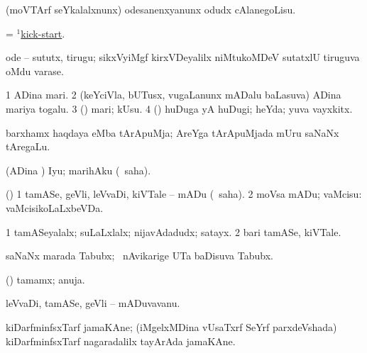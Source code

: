 \bentry
{}
\gl{\sakirx}
\bmng
(moVTArf seYkalalxnunx) odesanenxyanunx odudx cAlanegoLisu. 
\emng
\eentry

\bentry
{}
\gl{\nA}
\bmng
 = \hyperlink{kick-start(1)}{$^1$kick-start}. 
\emng
\eentry

\bentry
{}
\gl{\nA}
\bmng
ode -- sututx, tirugu; sikxVyiMgf kirxVDeyalilx niMtukoMDeV sutatxlU tiruguva oMdu varase. 
\emng
\eentry

\bentry
{}
\gl{\nA}
\bmng
\bnum
\num{1} ADina mari. 
\hypertarget{kid(1)2}{} 
\num{2} (keYciVla, bUTusx, \mo vugaLanunx mADalu baLasuva) ADina mariya togalu. 
\hypertarget{kid(1)3}{} 
\num{3} (\ashi) mari; kUsu. 
\num{4} (\ame) huDuga yA huDugi; heYda; yuva vayxkitx. 
\enum
\emng

\noindent
\gl{\pagu}
\bmng
  barxhamx haqdaya eMba tArApuMja; AreYga tArApuMjada mUru saNaNx tAregaLu. 
\emng
\eentry

\bentry
{}
\gl{\kirx}
\bmng
\emng

\noindent
\gl{\sakirx}
\bmng
(ADina \vi) Iyu; marihAku (\akirx\ saha). 
\emng
\eentry

\bentry
{}
\gl{\kirx}
\bmng
\emng

\noindent
\gl{\sakirx}
\bmng
(\ashi) 
\bnum
\num{1} tamASe, geVli, leVvaDi, kiVTale -- mADu (\akirx\ saha). 
\num{2} moVsa mADu; vaMcisu:  vaMcisikoLaLxbeVDa. 
\enum
\emng

\noindent
\gl{\pagu}
\bmng
\bnum
\num{1}  tamASeyalalx; suLaLxlalx; nijavAdadudx; satayx. 
\num{2}  bari tamASe, kiVTale. 
\enum
\emng
\eentry

\bentry
{}
\gl{\nA}
\bmng
saNaNx marada Tabubx; \kanmu\ nAvikarige UTa baDisuva Tabubx. 
\emng
\eentry

\bentry
{}
\gl{\nA}
\bmng
(\ashi) tamamx; anuja. 
\emng
\eentry

\bentry
{}
\gl{\nA}
\bmng
leVvaDi, tamASe, geVli -- mADuvavanu. 
\emng
\eentry

\bentry
{}
\gl{\nA}
\bmng
kiDarfminfsxTarf jamaKAne; (iMgelxMDina vUsaTxrf SeYrf parxdeVshada) kiDarfminfsxTarf nagaradalilx tayArAda jamaKAne. 
\emng
\eentry

